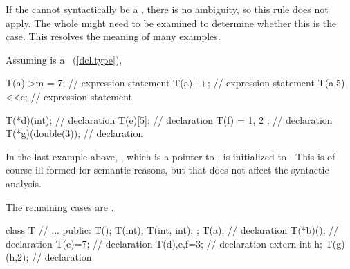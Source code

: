 \pnum
\begin{note}
If the  cannot syntactically be a
, there is no ambiguity,
so this rule does not apply.
The whole  might need to be examined
to determine whether this is the case. This resolves the meaning
of many examples.
\begin{example}
Assuming  is a
~(\ref{dcl.type}),

\begin{codeblock}
T(a)->m = 7;        // expression-statement
T(a)++;             // expression-statement
T(a,5)<<c;          // expression-statement

T(*d)(int);         //  declaration
T(e)[5];            //  declaration
T(f) = { 1, 2 };    //  declaration
T(*g)(double(3));   //  declaration
\end{codeblock}

In the last example above, , which is a pointer to ,
is initialized to . This is of course ill-formed for
semantic reasons, but that does not affect the syntactic analysis.
\end{example}

The remaining cases are .
\begin{example}

\begin{codeblock}
class T {
  // ...
public:
  T();
  T(int);
  T(int, int);
};
T(a);               //  declaration
T(*b)();            //  declaration
T(c)=7;             //  declaration
T(d),e,f=3;         //  declaration
extern int h;
T(g)(h,2);          //  declaration
\end{codeblock}
\end{example}
\end{note}

